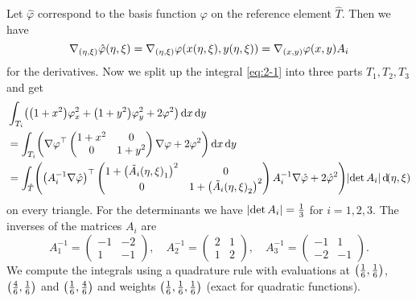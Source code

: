 \documentclass[english]{exercise}
\begin{document}
\begin{enumerate}
\[        \]
        Let \(\hat{\varphi}\) correspond to the basis function \(\varphi\) on the reference element \(\hat{T}\).
        Then we have
        \[
            \nabla_{\parentheses*{\eta, \xi}}\hat{\varphi}\parentheses*{\eta, \xi} = \nabla_{\parentheses*{\eta, \xi}}\varphi\parentheses*{x\parentheses*{\eta, \xi}, y\parentheses*{\eta, \xi}} = \nabla_{\parentheses*{x, y}}\varphi\parentheses*{x, y}A_i
        \]
        for the derivatives.
        Now we split up the integral \eqref{eq:2-1} into three parts \(T_1, T_2, T_3\) and get
        \begin{align*}
            &\int_{T_i}\parentheses*{\parentheses*{1 + x^2}\varphi_x^2 + \parentheses*{1 + y^2}\varphi_y^2 + 2\varphi^2}\d x\d y\\
            &= \int_{T_i}\parentheses*{\nabla\varphi^\top\begin{pmatrix}
                1 + x^2 & 0\\
                0 & 1 + y^2
            \end{pmatrix}\nabla\varphi + 2\varphi^2}\d x\d y\\
            &= \int_{\hat{T}}\parentheses*{\parentheses*{A_i^{-1}\nabla\hat{\varphi}}^\top \begin{pmatrix}
                1 + \parentheses*{\tilde{A}_i\parentheses*{\eta, \xi}_1}^2 & 0\\
                0 & 1 + \parentheses*{\tilde{A}_i\parentheses*{\eta, \xi}_2}^2
            \end{pmatrix}A_i^{-1}\nabla\hat{\varphi} + 2\hat{\varphi}^2}\absolute*{\det A_i}\d\parentheses*{\eta, \xi}
        \end{align*}
        on every triangle.
        For the determinants we have \(\absolute*{\det A_i} = \frac{1}{3}\) for \(i = 1, 2, 3\).
        The inverses of the matrices \(A_i\) are
        \[
            A_1^{-1} = \begin{pmatrix}
                -1 & -2\\
                1 & -1
            \end{pmatrix}, \quad A_2^{-1} = \begin{pmatrix}
                2 & 1\\
                1 & 2
            \end{pmatrix}, \quad A_3^{-1} = \begin{pmatrix}
                -1 & 1\\
                -2 & -1
            \end{pmatrix}.
        \]
        We compute the integrals using a quadrature rule with evaluations at \(\parentheses*{\frac{1}{6}, \frac{1}{6}}\), \(\parentheses*{\frac{4}{6}, \frac{1}{6}}\) and \(\parentheses*{\frac{1}{6}, \frac{4}{6}}\) and weights \(\parentheses*{\frac{1}{6}, \frac{1}{6}, \frac{1}{6}}\) (exact for quadratic functions).

\end{enumerate}
\end{document}
